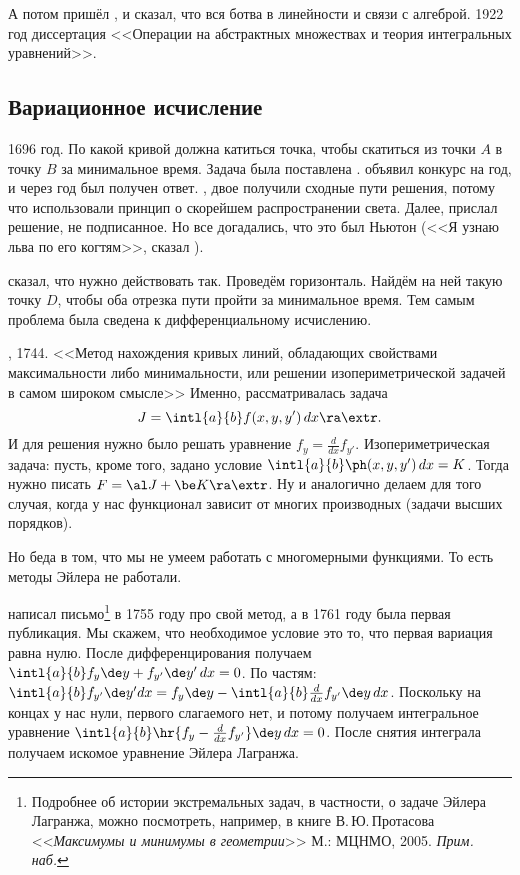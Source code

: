\documentclass[a4paper,oneside,fleqn,10pt]{article}
\begin{document}
А потом пришёл , и сказал, что вся ботва в линейности и
связи с алгеброй.  1922 год диссертация 
<<Операции на абстрактных множествах и теория интегральных
уравнений>>.

\subsection{Вариационное исчисление}

1696 год. По какой кривой должна катиться точка, чтобы скатиться из
точки $A$ в точку $B$ за минимальное время. Задача была поставлена
.   объявил
конкурс на год, и через год был получен ответ.  , двое
 получили сходные пути решения, потому что использовали
принцип  о скорейшем распространении света.  Далее,
 прислал решение, не подписанное. Но все догадались, что
это был Ньютон (<<Я узнаю льва по его когтям>>, сказал
).

 сказал, что нужно действовать так.  Проведём
горизонталь. Найдём на ней такую точку $D$, чтобы оба отрезка пути
пройти за минимальное время. Тем самым проблема была сведена к
дифференциальному исчислению.

, 1744. <<Метод нахождения кривых линий, обладающих
свойствами максимальности либо минимальности, или решении
изопериметрической задачей в самом широком смысле>> Именно,
рассматривалась задача
$$J = \intl{a}{b} f(x, y, y')\dx \ra \extr.$$ И для решения нужно было
решать уравнение $f_y = \frac{d}{dx} f_{y'}$.  Изопериметрическая
задача: пусть, кроме того, задано условие $\intl{a}{b} \ph(x,y,y')\dx
= K$. Тогда нужно писать $F = \al J + \be K \ra \extr$.  Ну и
аналогично делаем для того случая, когда у нас функционал зависит от
многих производных (задачи высших порядков).

Но беда в том, что мы не умеем работать с многомерными функциями.  То
есть методы Эйлера не работали.

 написал  письмо\footnote{Подробнее
  об истории экстремальных задач, в частности, о задаче Эйлера
  Лагранжа, можно посмотреть, например, в книге В.\,Ю.\,Протасова
  <<\emph{Максимумы и минимумы в геометрии}>> М.: МЦНМО,
  2005. \emph{Прим. наб.}}  в 1755 году про свой метод, а в 1761 году
была первая публикация. Мы скажем, что необходимое условие это то, что
первая вариация равна нулю. После дифференцирования получаем
$\intl{a}{b} f_y \de y + f_{y'} \de y'\dx = 0$.  По частям:
$\intl{a}{b} f_{y'} \de y'dx = f_y\de y - \intl{a}{b} \frac{d}{dx}
f_{y'}\de y \dx$.  Поскольку на концах у нас нули, первого слагаемого
нет, и потому получаем интегральное уравнение $\intl{a}{b} \hr{f_y -
  \frac{d}{dx} f_{y'} }\de y \dx = 0$.  После снятия интеграла
получаем искомое уравнение Эйлера Лагранжа.
\end{document}
